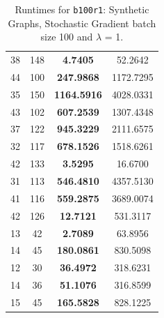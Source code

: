\documentclass{article}
\begin{document}
\begin{table}[h]
\begin{tabular}{lccc}
38 & 148 & \textbf{4.7405} & 52.2642 \\
44 & 100 & \textbf{247.9868} & 1172.7295 \\
35 & 150 & \textbf{1164.5916} & 4028.0331 \\
43 & 102 & \textbf{607.2539} & 1307.4348 \\
37 & 122 & \textbf{945.3229} & 2111.6575 \\
32 & 117 & \textbf{678.1526} & 1518.6261 \\
42 & 133 & \textbf{3.5295} & 16.6700 \\
31 & 113 & \textbf{546.4810} & 4357.5130 \\
41 & 116 & \textbf{559.2875} & 3689.0074 \\
42 & 126 & \textbf{12.7121} & 531.3117 \\
13 & 42 & \textbf{2.7089} & 63.8956 \\
14 & 45 & \textbf{180.0861} & 830.5098 \\
12 & 30 & \textbf{36.4972} & 318.6231 \\
14 & 36 & \textbf{51.1076} & 316.8599 \\
15 & 45 & \textbf{165.5828} & 828.1225 \\
\bottomrule
\end{tabular}
\caption{Runtimes for \texttt{b100r1}: Synthetic Graphs, Stochastic Gradient batch size 100 and $\lambda$ = 1.}
\end{table}
\end{document}
